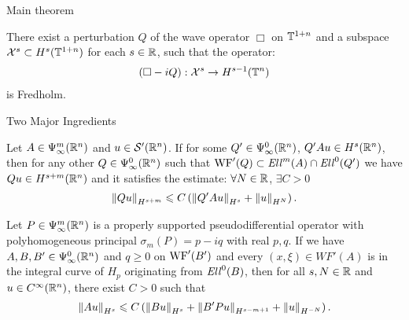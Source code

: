 \documentclass{beamer}
\begin{document}
\begin{frame}{Main theorem}
\begin{theorem}
    There exist a perturbation $Q$ of the wave operator $\Box$ on $\T^{1 + n}$ and a subspace $\X^s \subset H^{s}(\T^{1 +n})$ for each $s \in \R$, such that the operator: 
    \begin{align*}
    (\Box - iQ): \mathcal{X}^s \to H^{s - 1}(\T^n)
    \end{align*}
    is Fredholm. 
\end{theorem}

\end{frame} 

\begin{frame}{Two Major Ingredients}
\begin{theorem}
        Let $A \in \Psi^{m}_{\infty}(\R^n)$ and $u \in \sch'(\R^n)$. If for some $Q' \in \Psi^{0}_{\infty}(\R^n)$, $Q'Au \in H^{s}(\R^n)$, then for any other $Q \in \Psi^{0}_{\infty}(\R^n)$ such that $\WF'(Q) \subset \Ell^m(A) \cap \Ell^0(Q')$ we have $Qu \in H^{s + m}(\R^n)$ and it satisfies the estimate: $\forall N \in \R$, $\exists C > 0$ 
        \begin{align*}
        \norm[Qu]_{H^{s +m}} \leq C \brac{\norm[Q'Au]_{H^s} + \norm[u]_{H^N}}. 
        \end{align*}
\end{theorem}
\begin{theorem} \label{theorem: propagation of singularity estimates}
    Let $P \in \Psi^{m}_{\infty}(\R^n)$ is a properly supported pseudodifferential operator with polyhomogeneous principal $\sigma_m(P) = p - iq$ with real $p, q$. If we have $A, B, B' \in \Psi^{0}_{\infty}(\R^n)$ and $q \geq 0$ on $\WF'(B')$ and every $(x, \xi) \in WF'(A)$ is in the integral curve of $H_p$ originating from $\Ell^0(B)$, then for all $s, N \in \R$ and $u \in C^\infty(\R^n)$, there exist $C > 0$ such that 
    \begin{align*}
    \norm[Au]_{H^s} \leq C\brac{\norm[Bu]_{H^s} + \norm[B'Pu]_{H^{s - m + 1}} + \norm[u]_{H^{-N}}}. 
    \end{align*}
\end{theorem}
\end{frame} 
\end{document}
